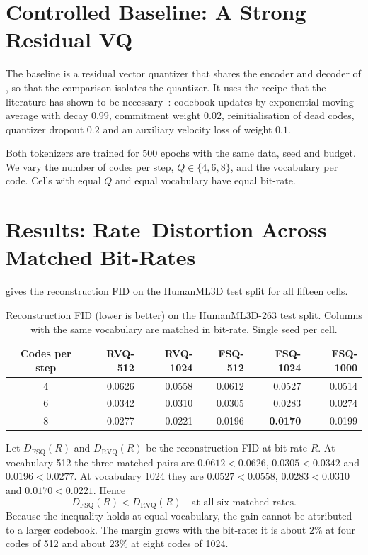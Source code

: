\section{Controlled Baseline: A Strong Residual VQ}
\label{sec:tok_baseline}

The baseline is a residual vector quantizer that shares the encoder and decoder of , so that the comparison isolates the quantizer. It uses the recipe that the literature has shown to be necessary~\cite{zhang2023t2mgpt,guo2024momask}: codebook updates by exponential moving average with decay $0.99$, commitment weight $0.02$, reinitialisation of dead codes, quantizer dropout $0.2$ and an auxiliary velocity loss of weight $0.1$.

Both tokenizers are trained for 500 epochs with the same data, seed and budget. We vary the number of codes per step, $Q \in \{4, 6, 8\}$, and the vocabulary per code. Cells with equal $Q$ and equal vocabulary have equal bit-rate.

\section{Results: Rate--Distortion Across Matched Bit-Rates}
\label{sec:tok_rd}

 gives the reconstruction FID on the HumanML3D test split for all fifteen cells.

\begin{table}[H]
\centering
\caption{Reconstruction FID (lower is better) on the HumanML3D-263 test split. Columns with the same vocabulary are matched in bit-rate. Single seed per cell.}
\label{tab:tok_matrix}
\begin{tabular}{crrrrr}
\toprule
Codes per step & RVQ-512 & RVQ-1024 & FSQ-512 & FSQ-1024 & FSQ-1000 \\
\midrule
4 & 0.0626 & 0.0558 & 0.0612 & 0.0527 & 0.0514 \\
6 & 0.0342 & 0.0310 & 0.0305 & 0.0283 & 0.0274 \\
8 & 0.0277 & 0.0221 & 0.0196 & \textbf{0.0170} & 0.0199 \\
\bottomrule
\end{tabular}
\end{table}

Let $D_{\mathrm{FSQ}}(R)$ and $D_{\mathrm{RVQ}}(R)$ be the reconstruction FID at bit-rate $R$. At vocabulary 512 the three matched pairs are $0.0612 < 0.0626$, $0.0305 < 0.0342$ and $0.0196 < 0.0277$. At vocabulary 1024 they are $0.0527 < 0.0558$, $0.0283 < 0.0310$ and $0.0170 < 0.0221$. Hence
\begin{equation}
D_{\mathrm{FSQ}}(R) < D_{\mathrm{RVQ}}(R) \quad \text{at all six matched rates.}
\end{equation}
Because the inequality holds at equal vocabulary, the gain cannot be attributed to a larger codebook. The margin grows with the bit-rate: it is about $2\%$ at four codes of 512 and about $23\%$ at eight codes of 1024.


